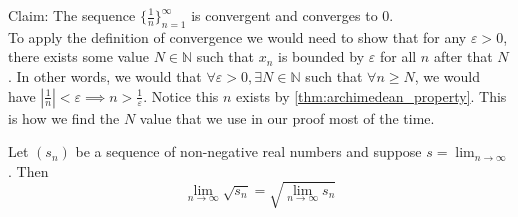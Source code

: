 \documentclass[../main.tex]{subfiles}
\begin{document}
    
    
    
    
    
    
    
    
    
    
    
    
    
    
    
    
    
    
    
    
    \begin{exercise}
    Claim: The sequence $\{\frac{1}{n}\}_{n=1}^{\infty}$ is convergent and converges to \(0\).\\
    \textnormal{To apply the definition of convergence we would need to show that for any \(\varepsilon > 0\), there exists some value \(N \in \mathbb{N}\) such that \(x_n\) is bounded by $\varepsilon$ for all \(n\) after that \(N\). In other words, we would that \(\forall \varepsilon > 0, \exists N \in \mathbb{N}\) such that \(\forall n \geq N\), we would have \(|\frac{1}{n}| < \varepsilon \implies n > \frac{1}{\varepsilon}\). Notice this \(n\) exists by \ref{thm:archimedean_property}. This is how we find the \(N\) value that we use in our proof most of the time.}
    
    \end{exercise}
    
    
    
    
    
    
    
    
    
    
    
    
    
    
    
    
    
    
    \begin{exercise}
    
    Let \( (s_n)\) be a sequence of non-negative real numbers and suppose \( s = \lim_{n \to \infty}\). Then
    \[
    \lim_{n \to \infty}{\sqrt{s_n}} = \sqrt{\lim_{n \to \infty}{s_n}}
    \]
    
    \end{exercise}
    
\end{document}

